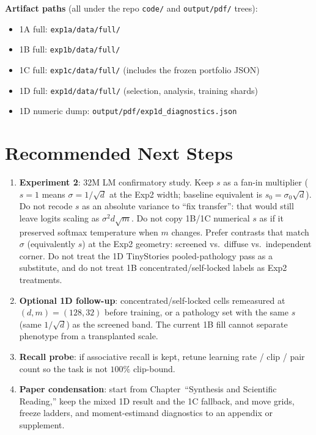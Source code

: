 \documentclass[11pt,a4paper]{report}
\begin{document}
\textbf{Artifact paths} (all under the repo \texttt{code/} and \texttt{output/pdf/} trees):
\begin{itemize}[leftmargin=*]
  \item 1A full: \texttt{exp1a/data/full/}
  \item 1B full: \texttt{exp1b/data/full/}
  \item 1C full: \texttt{exp1c/data/full/} (includes the frozen portfolio JSON)
  \item 1D full: \texttt{exp1d/data/full/} (selection, analysis, training shards)
  \item 1D numeric dump: \texttt{output/pdf/exp1d\_diagnostics.json}
\end{itemize}

\chapter{Recommended Next Steps}

\begin{enumerate}[leftmargin=*]
  \item \textbf{Experiment 2}: 32M LM confirmatory study. Keep $s$ as a fan-in multiplier ($s=1$ means $\sigma=1/\sqrt{d}$ at the Exp2 width; baseline equivalent is $s_0=\sigma_0\sqrt{d}$). Do not recode $s$ as an absolute variance to ``fix transfer'': that would still leave logits scaling as $\sigma^2 d\sqrt{m}$. Do not copy 1B/1C numerical $s$ as if it preserved softmax temperature when $m$ changes. Prefer contrasts that match $\sigma$ (equivalently $s$) at the Exp2 geometry: screened vs.\ diffuse vs.\ independent corner. Do not treat the 1D TinyStories pooled-pathology pass as a substitute, and do not treat 1B concentrated/self-locked labels as Exp2 treatments.
  \item \textbf{Optional 1D follow-up}: concentrated/self-locked cells remeasured at $(d,m)=(128,32)$ before training, or a pathology set with the same $s$ (same $1/\sqrt{d}$) as the screened band. The current 1B fill cannot separate phenotype from a transplanted scale.
  \item \textbf{Recall probe}: if associative recall is kept, retune learning rate / clip / pair count so the task is not $100\%$ clip-bound.
  \item \textbf{Paper condensation}: start from Chapter~``Synthesis and Scientific Reading,'' keep the mixed 1D result and the 1C fallback, and move grids, freeze ladders, and moment-estimand diagnostics to an appendix or supplement.
\end{enumerate}
\end{document}
